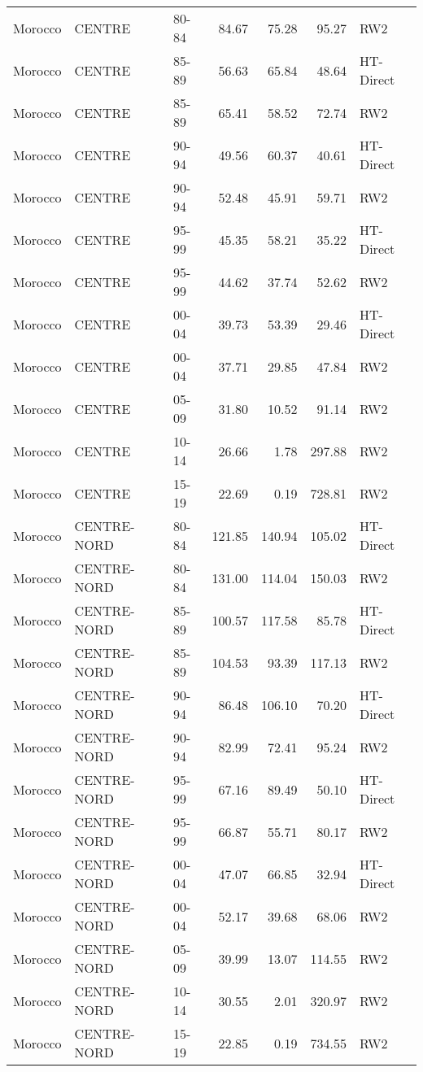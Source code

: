 \begin{longtable}{lllrrrl}
  Morocco & CENTRE & 80-84 & 84.67 & 75.28 & 95.27 & RW2 \\ 
  Morocco & CENTRE & 85-89 & 56.63 & 65.84 & 48.64 & HT-Direct \\ 
  Morocco & CENTRE & 85-89 & 65.41 & 58.52 & 72.74 & RW2 \\ 
  Morocco & CENTRE & 90-94 & 49.56 & 60.37 & 40.61 & HT-Direct \\ 
  Morocco & CENTRE & 90-94 & 52.48 & 45.91 & 59.71 & RW2 \\ 
  Morocco & CENTRE & 95-99 & 45.35 & 58.21 & 35.22 & HT-Direct \\ 
  Morocco & CENTRE & 95-99 & 44.62 & 37.74 & 52.62 & RW2 \\ 
  Morocco & CENTRE & 00-04 & 39.73 & 53.39 & 29.46 & HT-Direct \\ 
  Morocco & CENTRE & 00-04 & 37.71 & 29.85 & 47.84 & RW2 \\ 
  Morocco & CENTRE & 05-09 & 31.80 & 10.52 & 91.14 & RW2 \\ 
  Morocco & CENTRE & 10-14 & 26.66 & 1.78 & 297.88 & RW2 \\ 
  Morocco & CENTRE & 15-19 & 22.69 & 0.19 & 728.81 & RW2 \\ 
  Morocco & CENTRE-NORD & 80-84 & 121.85 & 140.94 & 105.02 & HT-Direct \\ 
  Morocco & CENTRE-NORD & 80-84 & 131.00 & 114.04 & 150.03 & RW2 \\ 
  Morocco & CENTRE-NORD & 85-89 & 100.57 & 117.58 & 85.78 & HT-Direct \\ 
  Morocco & CENTRE-NORD & 85-89 & 104.53 & 93.39 & 117.13 & RW2 \\ 
  Morocco & CENTRE-NORD & 90-94 & 86.48 & 106.10 & 70.20 & HT-Direct \\ 
  Morocco & CENTRE-NORD & 90-94 & 82.99 & 72.41 & 95.24 & RW2 \\ 
  Morocco & CENTRE-NORD & 95-99 & 67.16 & 89.49 & 50.10 & HT-Direct \\ 
  Morocco & CENTRE-NORD & 95-99 & 66.87 & 55.71 & 80.17 & RW2 \\ 
  Morocco & CENTRE-NORD & 00-04 & 47.07 & 66.85 & 32.94 & HT-Direct \\ 
  Morocco & CENTRE-NORD & 00-04 & 52.17 & 39.68 & 68.06 & RW2 \\ 
  Morocco & CENTRE-NORD & 05-09 & 39.99 & 13.07 & 114.55 & RW2 \\ 
  Morocco & CENTRE-NORD & 10-14 & 30.55 & 2.01 & 320.97 & RW2 \\ 
  Morocco & CENTRE-NORD & 15-19 & 22.85 & 0.19 & 734.55 & RW2 \\ 

\end{longtable}
